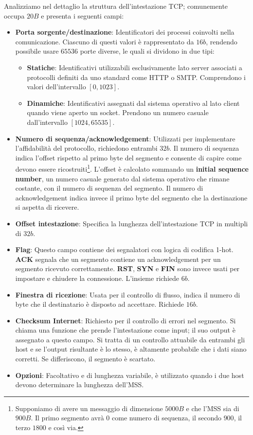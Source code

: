 \noindent Analizziamo nel dettaglio la struttura dell'intestazione TCP; comunemente occupa $20B$ e presenta i seguenti campi: \begin{itemize}
	\item \textbf{Porta sorgente/destinazione}: Identificatori dei processi coinvolti nella comunicazione. Ciascuno di questi valori è rappresentato
	da $16b$, rendendo possibile usare $65536$ porte diverse, le quali si dividono in due tipi: \begin{itemize}
		\item \textbf{Statiche}: Identificativi utilizzabili esclusivamente lato server associati a protocolli definiti da uno standard come HTTP o
		SMTP. Comprendono i valori dell'intervallo $[0, 1023]$.
		\item \textbf{Dinamiche}: Identificativi assegnati dal sistema operativo al lato client quando viene aperto un socket. Prendono un numero
		casuale dall'intervallo $[1024, 65535]$.
	\end{itemize}
	\item \textbf{Numero di sequenza/acknowledgement}: Utilizzati per implementare l'affidabilità del protocollo, richiedono entrambi $32b$. Il numero
	di sequenza indica l'offset rispetto al primo byte del segmento e consente di capire come devono essere ricostruiti\footnote{Supponiamo di avere un
	messaggio di dimensione $5000B$ e che l'MSS sia di $900B$. Il primo segmento avrà $0$ come numero di sequenza, il secondo $900$, il terzo $1800$ e
	così via.}. L'offset è calcolato sommando un \textbf{initial sequence number}, un numero casuale generato dal sistema operativo che rimane
	costante, con il numero di sequenza del segmento. Il numero di acknowledgement indica invece il primo byte del segmento che la destinazione si
	aspetta di ricevere.
	\item \textbf{Offset intestazione}: Specifica la lunghezza dell'intestazione TCP in multipli di $32b$.
	\item \textbf{Flag}: Questo campo contiene dei segnalatori con logica di codifica 1-hot. \textbf{ACK} segnala che un segmento contiene un
	acknowledgement per un segmento ricevuto correttamente. \textbf{RST}, \textbf{SYN} e \textbf{FIN} sono invece usati per impostare e chiudere la
	connessione. L'insieme richiede $6b$.
	\item \textbf{Finestra di ricezione}: Usata per il controllo di flusso, indica il numero di byte che il destinatario è disposto ad accettare.
	Richiede $16b$.
	\item \textbf{Checksum Internet}: Richiesto per il controllo di errori nel segmento. Si chiama una funzione che prende l'intestazione come input;
	il suo output è assegnato a questo campo. Si tratta di un controllo attuabile da entrambi gli host e se l'output risultante è lo stesso, è altamente
	probabile che i dati siano corretti. Se differiscono, il segmento è scartato.
	\item \textbf{Opzioni}: Facoltativo e di lunghezza variabile, è utilizzato quando i due host devono determinare la lunghezza dell'MSS.
\end{itemize}

